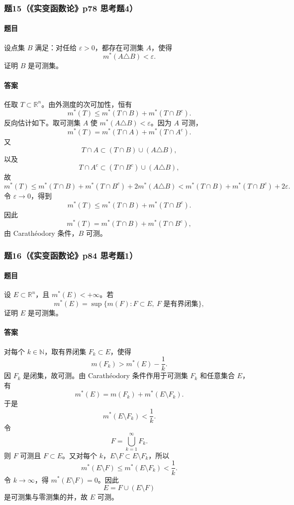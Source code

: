 \documentclass{article}
\newcommand{\R}{\mathbb{R}}
\newcommand{\N}{\mathbb{N}}
\newcommand{\eps}{\varepsilon}
\newcommand{\meas}{m}
\newcommand{\mouter}{m^*}
\begin{document}
	\subsubsection*{题15（《实变函数论》p78 思考题4）}
	\paragraph{题目}设点集 $B$ 满足：对任给 $\eps>0$，都存在可测集 $A$，使得
	\[
	\mouter(A\triangle B)<\eps.
	\]
	证明 $B$ 是可测集。
	
	\paragraph{答案}任取 $T\subset\R^n$。由外测度的次可加性，恒有
	\[
	\mouter(T)\le \mouter(T\cap B)+\mouter(T\cap B^c).
	\]
	反向估计如下。取可测集 $A$ 使 $\mouter(A\triangle B)<\eps$。因为 $A$ 可测，
	\[
	\mouter(T)=\mouter(T\cap A)+\mouter(T\cap A^c).
	\]
	又
	\[
	T\cap A\subset (T\cap B)\cup(A\triangle B),
	\]
	以及
	\[
	T\cap A^c\subset (T\cap B^c)\cup(A\triangle B),
	\]
	故
	\[
	\mouter(T)
	\le \mouter(T\cap B)+\mouter(T\cap B^c)+2\mouter(A\triangle B)
	<\mouter(T\cap B)+\mouter(T\cap B^c)+2\eps.
	\]
	令 $\eps\to0$，得到
	\[
	\mouter(T)\le \mouter(T\cap B)+\mouter(T\cap B^c).
	\]
	因此
	\[
	\mouter(T)= \mouter(T\cap B)+\mouter(T\cap B^c),
	\]
	由 Carath\'eodory 条件，$B$ 可测。
	
	\subsubsection*{题16（《实变函数论》p84 思考题1）}
	\paragraph{题目}设 $E\subset\R^n$，且 $\mouter(E)<+\infty$。若
	\[
	\mouter(E)=\sup\{\meas(F):F\subset E,\ F\text{ 是有界闭集}\},
	\]
	证明 $E$ 是可测集。
	
	\paragraph{答案}对每个 $k\in\N$，取有界闭集 $F_k\subset E$，使得
	\[
	\meas(F_k)>\mouter(E)-\frac1k.
	\]
	因 $F_k$ 是闭集，故可测。由 Carath\'eodory 条件作用于可测集 $F_k$ 和任意集合 $E$，有
	\[
	\mouter(E)=\meas(F_k)+\mouter(E\setminus F_k).
	\]
	于是
	\[
	\mouter(E\setminus F_k)<\frac1k.
	\]
	令
	\[
	F=\bigcup_{k=1}^{\infty}F_k.
	\]
	则 $F$ 可测且 $F\subset E$。又对每个 $k$，$E\setminus F\subset E\setminus F_k$，所以
	\[
	\mouter(E\setminus F)\le\mouter(E\setminus F_k)<\frac1k.
	\]
	令 $k\to\infty$，得 $\mouter(E\setminus F)=0$。因此
	\[
	E=F\cup(E\setminus F)
	\]
	是可测集与零测集的并，故 $E$ 可测。
	
\end{document}
